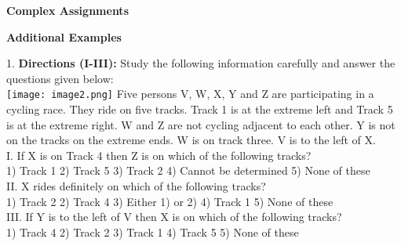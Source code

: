 \documentclass[
]{article}
\author{}
\date{}
\begin{document}
	
 

\begin{center}
	{\Large \textbf{Complex Assignments \\}}
\end{center}

{\large \textbf{ Additional Examples \\}}

1. \textbf{Directions (I-III):} Study the following information carefully and answer the questions given
below:\\
\texttt{[image: image2.png]}
Five persons V, W, X, Y and Z are participating in a cycling race. They ride on five tracks.
Track 1 is at the extreme left and Track 5 is at the extreme right. W and Z are not cycling
adjacent to each other. Y is not on the tracks on the extreme ends. W is on track three. V is to
the left of X.\\

I. If X is on Track 4 then Z is on which of the following tracks?\\
1) Track 1 \hspace{2mm}2) Track 5 \hspace{2mm}3) Track 2
\hspace{2mm}4) Cannot be determined \hspace{2mm}5) None of these\\

II. X rides definitely on which of the following tracks?\\
1) Track 2 \hspace{2mm}2) Track 4 \hspace{2mm}3) Either 1) or 2)
\hspace{2mm}4) Track 1 \hspace{2mm}5) None of these\\

III. If Y is to the left of V then X is on which of the following tracks?\\
1) Track 4 \hspace{2mm}2) Track 2 \hspace{2mm}3) Track 1 \hspace{2mm}4) Track 5 \hspace{2mm}5) None of these\\
\end{document}
